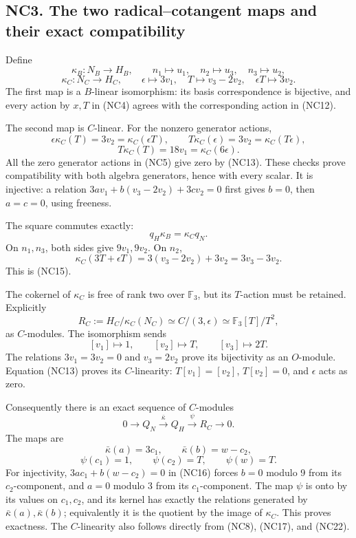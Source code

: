 \documentclass[
  10pt,
]{article}
\begin{document}
\subsection{NC3. The two radical--cotangent maps and their exact
compatibility}\label{nc3.-the-two-radicalcotangent-maps-and-their-exact-compatibility}

Define \[
\kappa_B:N_B\longrightarrow H_B,\qquad
n_1\longmapsto u_1,\quad n_2\longmapsto u_3,\quad n_3\longmapsto u_2,
\] \[
\kappa_C:N_C\longrightarrow H_C,\qquad
\epsilon\longmapsto3v_1,\quad
T\longmapsto v_3-2v_2,\quad
\epsilon T\longmapsto3v_2.
\tag{NC18}
\] The first map is a \(B\)-linear isomorphism: its basis correspondence
is bijective, and every action by \(x,T\) in (NC4) agrees with the
corresponding action in (NC12).

The second map is \(C\)-linear. For the nonzero generator actions, \[
\epsilon\kappa_C(T)=3v_2=\kappa_C(\epsilon T),\qquad
T\kappa_C(\epsilon)=3v_2=\kappa_C(T\epsilon),
\] \[
T\kappa_C(T)=18v_1=\kappa_C(6\epsilon).
\] All the zero generator actions in (NC5) give zero by (NC13). These
checks prove compatibility with both algebra generators, hence with
every scalar. It is injective: a relation \(3av_1+b(v_3-2v_2)+3cv_2=0\)
first gives \(b=0\), then \(a=c=0\), using freeness.

The square commutes exactly: \[
q_H\kappa_B=\kappa_Cq_N.
\tag{NC19}
\] On \(n_1,n_3\), both sides give \(9v_1,9v_2\). On \(n_2\), \[
\kappa_C(3T+\epsilon T)=3(v_3-2v_2)+3v_2=3v_3-3v_2.
\] This is (NC15).

The cokernel of \(\kappa_C\) is free of rank two over \(\mathbb F_3\),
but its \(T\)-action must be retained. Explicitly \[
R_C:=H_C/\kappa_C(N_C)\simeq C/(3,\epsilon)
\simeq\mathbb F_3[T]/T^2,
\tag{NC20}
\] as \(C\)-modules. The isomorphism sends \[
[v_1]\longmapsto1,\qquad[v_2]\longmapsto T,\qquad
[v_3]\longmapsto2T.
\] The relations \(3v_1=3v_2=0\) and \(v_3=2v_2\) prove its bijectivity
as an \(O\)-module. Equation (NC13) proves its \(C\)-linearity:
\(T[v_1]=[v_2]\), \(T[v_2]=0\), and \(\epsilon\) acts as zero.

Consequently there is an exact sequence of \(C\)-modules \[
0\longrightarrow Q_N\xrightarrow{\bar\kappa}Q_H
\xrightarrow{\psi}R_C\longrightarrow0.
\tag{NC21}
\] The maps are \[
\bar\kappa(a)=3c_1,\qquad
\bar\kappa(b)=w-c_2,
\] \[
\psi(c_1)=1,\qquad\psi(c_2)=T,\qquad\psi(w)=T.
\tag{NC22}
\] For injectivity, \(3ac_1+b(w-c_2)=0\) in (NC16) forces \(b=0\) modulo
9 from its \(c_2\)-component, and \(a=0\) modulo 3 from its
\(c_1\)-component. The map \(\psi\) is onto by its values on
\(c_1,c_2\), and its kernel has exactly the relations generated by
\(\bar\kappa(a),\bar\kappa(b)\); equivalently it is the quotient by the
image of \(\kappa_C\). This proves exactness. The \(C\)-linearity also
follows directly from (NC8), (NC17), and (NC22).
\end{document}
